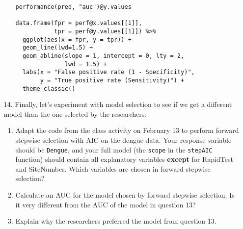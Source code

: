 \documentclass[11pt]{article}
\begin{document}
\begin{enumerate}
\begin{enumerate}
\begin{verbatim}
performance(pred, "auc")@y.values 

data.frame(fpr = perf@x.values[[1]],
           tpr = perf@y.values[[1]]) %>%
  ggplot(aes(x = fpr, y = tpr)) +
  geom_line(lwd=1.5) +
  geom_abline(slope = 1, intercept = 0, lty = 2,
              lwd = 1.5) +
  labs(x = "False positive rate (1 - Specificity)",
       y = "True positive rate (Sensitivity)") +
  theme_classic()
\end{verbatim}

\end{enumerate}

\item[14.] Finally, let's experiment with model selection to see if we get a different model than the one selected by the researchers.

\begin{enumerate}
\item Adapt the code from the class activity on February 13 to perform forward stepwise selection with AIC on the dengue data. Your response variable should be \verb;Dengue;, and your full model (the \verb;scope; in the \verb;stepAIC; function) should contain all explanatory variables \textbf{except} for RapidTest and SiteNumber. Which variables are chosen in forward stepwise selection?

\item Calculate an AUC for the model chosen by forward stepwise selection. Is it very different from the AUC of the model in question 13?

\item Explain why the researchers preferred the model from question 13.
\end{enumerate}

\end{enumerate}
\end{document}
